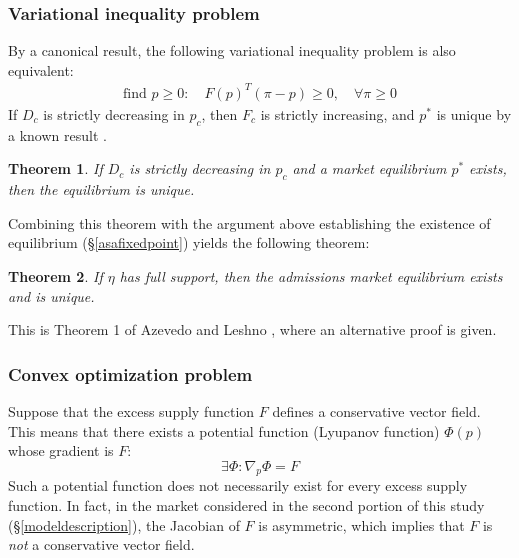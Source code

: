 \documentclass[12pt]{article}
\newtheorem{theorem}{Theorem}
\theoremstyle{definition}
\begin{document}
\subsubsection{Variational inequality problem}
By a canonical result, the following variational inequality problem is also equivalent:
\begin{align*}
\text{find } p \geq 0:\quad F(p)^T (\pi-p) \geq 0, \quad \forall \pi \geq 0
\end{align*}
If $D_c$ is strictly decreasing in $p_c$, then $F_c$ is strictly increasing, and $p^*$ is unique by a known result \parencite[][\S2]{theoryofvariationalinequalities}.
\begin{theorem} \label{demanddecreasingimpliesunique}
If $D_c$ is strictly decreasing in $p_c$ and a market equilibrium $p^*$ exists, then the equilibrium is unique.
\end{theorem}

Combining this theorem with the argument above establishing the existence of equilibrium (\S\ref{asafixedpoint}) yields the following theorem:
\begin{theorem} \label{fullsupportimpliesunique}
If $\eta$ has full support, then the admissions market equilibrium exists and is unique.
\end{theorem}
This is Theorem 1 of Azevedo and Leshno \parencite*{supplydemandfw}, where an alternative proof is given.

\subsubsection{Convex optimization problem}
Suppose that the excess supply function $F$ defines a conservative vector field. This means that there exists a potential function (Lyupanov function) $\Phi(p)$ whose gradient is $F$:
\[\exists \Phi: \nabla_p \Phi = F\]
Such a potential function does not necessarily exist for every excess supply function. In fact, in the market considered in the second portion of this study (\S\ref{modeldescription}), the Jacobian of $F$ is asymmetric, which implies that $F$ is \emph{not} a conservative vector field. 
\end{document}
